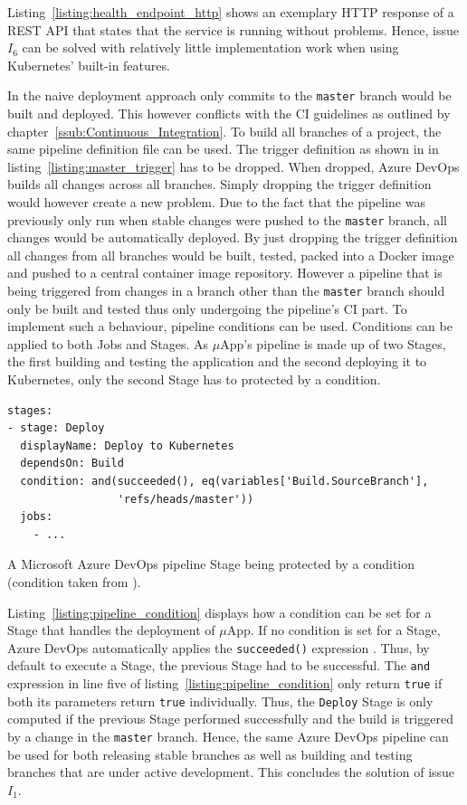 Listing~\ref{listing:health_endpoint_http} shows an exemplary \ac{HTTP}
response of a \ac{REST} \ac{API} that states that the service is running
without problems. Hence, issue $I_6$ can be solved with relatively little
implementation work when using Kubernetes' built-in features.

In the naive deployment approach only commits to the \texttt{master} branch
would be built and deployed. This however conflicts with the \ac{CI} guidelines
as outlined by chapter~\ref{ssub:Continuous_Integration}. To build all branches
of a project, the same pipeline definition file can be used. The trigger
definition as shown in in listing~\ref{listing:master_trigger} has to be
dropped. When dropped, Azure DevOps builds all changes across all branches.
Simply dropping the trigger definition would however create a new problem. Due
to the fact that the pipeline was previously only run when stable changes were
pushed to the \texttt{master} branch, all changes would be automatically
deployed. By just dropping the trigger definition all changes from all branches
would be built, tested, packed into a Docker image and pushed to a central
container image repository. However a pipeline that is being triggered from
changes in a branch other than the \texttt{master} branch should only be built
and tested thus only undergoing the pipeline's \ac{CI} part. To implement such
a behaviour, pipeline conditions can be used. Conditions can be applied to both
Jobs and Stages. As $\mu$App's pipeline is made up of two Stages, the first
building and testing the application and the second deploying it to Kubernetes,
only the second Stage has to protected by a condition.

\begin{listing}[H]
  \begin{verbatim}
stages:
- stage: Deploy
  displayName: Deploy to Kubernetes
  dependsOn: Build
  condition: and(succeeded(), eq(variables['Build.SourceBranch'],
                 'refs/heads/master'))
  jobs:
    - ...
  \end{verbatim}
  \caption[A Microsoft Azure DevOps pipeline Stage being protected by a
  condition.]{A Microsoft Azure DevOps pipeline Stage being protected by a
  condition (condition taken from \autocite{MicrosoftConditions2019}).}%
  \label{listing:pipeline_condition}
\end{listing}

Listing~\ref{listing:pipeline_condition} displays how a condition can be set
for a Stage that handles the deployment of $\mu$App. If no condition is set for
a Stage, Azure DevOps automatically applies the \texttt{succeeded()}
expression \autocite{MicrosoftConditions2019}. Thus, by default to execute a
Stage, the previous Stage had to be successful. The \texttt{and} expression in
line five of listing~\ref{listing:pipeline_condition} only return \texttt{true}
if both its parameters return \texttt{true} individually. Thus, the
\texttt{Deploy} Stage is only computed if the previous Stage performed
successfully and the build is triggered by a change in the \texttt{master}
branch. Hence, the same Azure DevOps pipeline can be used for both releasing
stable branches as well as building and testing branches that are under active
development. This concludes the solution of issue $I_1$.

